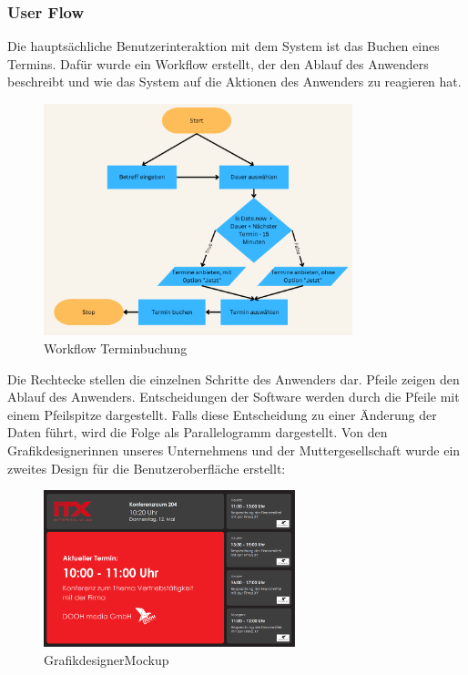 \subsubsection{User Flow}\label{subsubsec:user-flow}
Die hauptsächliche Benutzerinteraktion mit dem System ist das Buchen eines Termins.
Dafür wurde ein Workflow erstellt, der den Ablauf des Anwenders beschreibt und wie das System auf die Aktionen des Anwenders zu reagieren hat.
\begin{figure}[h]
\par\vspace{1cm}
\centering
\includegraphics[width=0.8\textwidth]{Bilder/Workflow Terminbuchung}
\caption{Workflow Terminbuchung}
\label{fig:Workflow Terminbuchung}
\par\vspace{1cm}
\end{figure}
\justifying
\newline
Die Rechtecke stellen die einzelnen Schritte des Anwenders dar.
Pfeile zeigen den Ablauf des Anwenders.
Entscheidungen der Software werden durch die Pfeile mit einem Pfeilspitze dargestellt.
Falls diese Entscheidung zu einer Änderung der Daten führt, wird die Folge als Parallelogramm dargestellt.
\newline
\newline
Von den Grafikdesignerinnen unseres Unternehmens und der Muttergesellschaft wurde ein zweites Design für die Benutzeroberfläche erstellt:

\newline
\begin{figure}[hbt!]
\par\vspace{1cm}
\centering
\includegraphics[width=0.65\textwidth]{Bilder/GrafikdesignerMockup}
\caption{GrafikdesignerMockup}
\label{fig:GrafikdesignerMockup}
\par\vspace{1cm}
\end{figure}
\justifying

